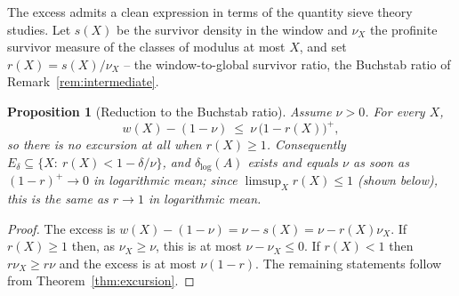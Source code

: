 \documentclass[11pt]{article}
\theoremstyle{plain}
\newtheorem{proposition}[theorem]{Proposition}
\theoremstyle{definition}
\newcommand{\dlog}{\delta_{\log}}
\begin{document}
The excess admits a clean expression in terms of the quantity
sieve theory studies.  Let $s(X)$ be the survivor density in the
window and $\nu_X$ the profinite survivor measure of the classes
of modulus at most $X$, and set $r(X)=s(X)/\nu_X$ -- the
window-to-global survivor ratio, the Buchstab ratio of
Remark~\ref{rem:intermediate}.

\begin{proposition}[Reduction to the Buchstab ratio]\label{prop:ratio}
Assume $\nu>0$.  For every $X$,
\[
  w(X)-(1-\nu)\ \le\ \nu\,\bigl(1-r(X)\bigr)^{+},
\]
so there is no excursion at all when $r(X)\ge1$.  Consequently
$E_\delta\subseteq\{X:\ r(X)<1-\delta/\nu\}$, and $\dlog(A)$
exists and equals $\nu$ as soon as $(1-r)^{+}\to0$ in
logarithmic mean; since $\limsup_Xr(X)\le1$ (shown below), this
is the same as $r\to1$ in logarithmic mean.
\end{proposition}

\begin{proof}
The excess is $w(X)-(1-\nu)=\nu-s(X)=\nu-r(X)\nu_X$.  If
$r(X)\ge1$ then, as $\nu_X\ge\nu$, this is at most
$\nu-\nu_X\le0$.  If $r(X)<1$ then $r\nu_X\ge r\nu$ and the
excess is at most $\nu(1-r)$.  The remaining statements follow
from Theorem~\ref{thm:excursion}.
\end{proof}
\end{document}
